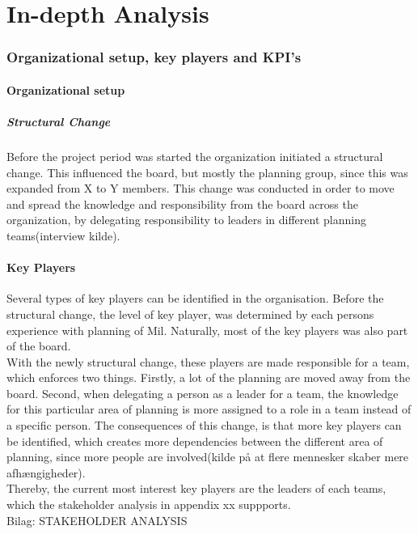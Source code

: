 \part{In-depth Analysis}

\section{Organizational setup, key players and KPI's}
\subsection{Organizational setup}
\subsubsection{Structural Change}
Before the project period was started the organization initiated a structural change. This influenced the board, but mostly the planning group, since this was expanded from X to Y members. This change was conducted in order to move and spread the knowledge and responsibility from the board across the organization, by delegating responsibility to leaders in different planning teams(interview kilde).

\subsection{Key Players}
Several types of key players can be identified in the organisation. Before the structural change, the level of key player, was determined by each persons experience with planning of Mil. Naturally, most of the key players was also part of the board.\\
With the newly structural change, these players are made responsible for a team, which enforces two things. Firstly, a lot of the planning are moved away from the board. Second, when delegating a person as a leader for a team, the knowledge for this particular area of planning is more assigned to a role in a team instead of a specific person. The consequences of this change, is that more key players can be identified, which creates more dependencies between the different area of planning, since more people are involved(kilde på at flere mennesker skaber mere afhængigheder).\\
Thereby, the current most interest key players are the leaders of each teams, which the stakeholder analysis in appendix xx suppports.\\
Bilag: STAKEHOLDER ANALYSIS\\

